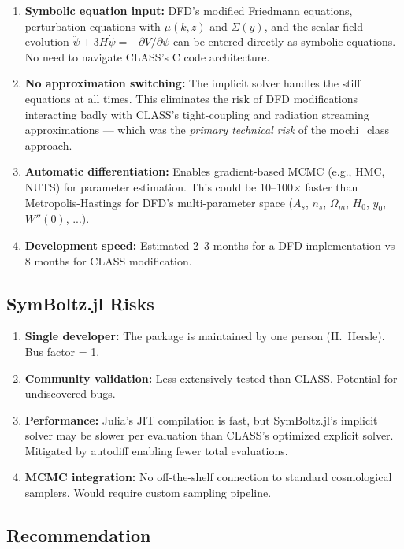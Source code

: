 \documentclass[11pt,a4paper]{article}
\begin{document}
\begin{enumerate}
\item \textbf{Symbolic equation input:} DFD's modified Friedmann equations, perturbation equations with $\mu(k,z)$ and $\Sigma(y)$, and the scalar field evolution $\ddot{\psi} + 3H\dot{\psi} = -\partial V/\partial\psi$ can be entered directly as symbolic equations. No need to navigate CLASS's C code architecture.

\item \textbf{No approximation switching:} The implicit solver handles the stiff equations at all times. This eliminates the risk of DFD modifications interacting badly with CLASS's tight-coupling and radiation streaming approximations --- which was the \emph{primary technical risk} of the mochi\_class approach.

\item \textbf{Automatic differentiation:} Enables gradient-based MCMC (e.g., HMC, NUTS) for parameter estimation. This could be 10--100$\times$ faster than Metropolis-Hastings for DFD's multi-parameter space ($A_s$, $n_s$, $\Omega_m$, $H_0$, $y_0$, $W''(0)$, ...).

\item \textbf{Development speed:} Estimated 2--3 months for a DFD implementation vs 8 months for CLASS modification.
\end{enumerate}

\subsection{SymBoltz.jl Risks}

\begin{enumerate}
\item \textbf{Single developer:} The package is maintained by one person (H.~Hersle). Bus factor = 1.
\item \textbf{Community validation:} Less extensively tested than CLASS. Potential for undiscovered bugs.
\item \textbf{Performance:} Julia's JIT compilation is fast, but SymBoltz.jl's implicit solver may be slower per evaluation than CLASS's optimized explicit solver. Mitigated by autodiff enabling fewer total evaluations.
\item \textbf{MCMC integration:} No off-the-shelf connection to standard cosmological samplers. Would require custom sampling pipeline.
\end{enumerate}

\subsection{Recommendation}
\end{document}
